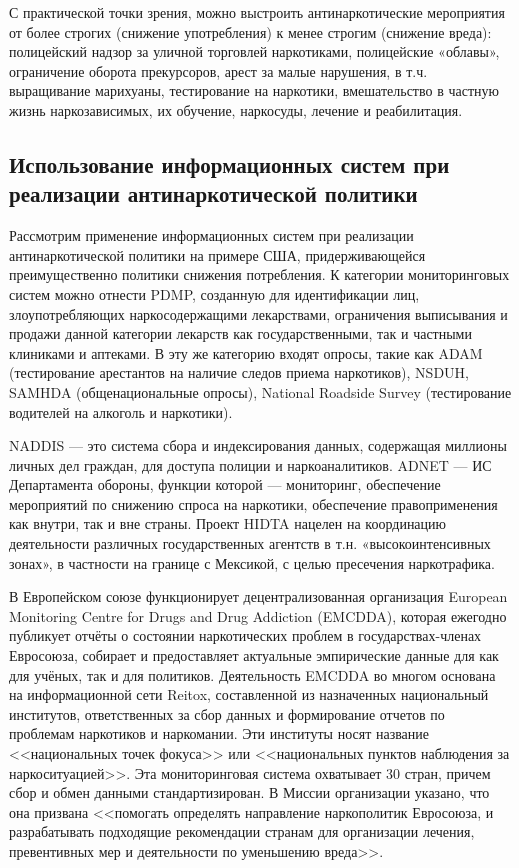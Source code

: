 \documentclass[a4paper,14pt]{article}
\begin{document}
С практической точки зрения, можно выстроить антинаркотические мероприятия от 
более строгих (снижение употребления) к менее строгим (снижение вреда): 
полицейский надзор за уличной торговлей наркотиками, полицейские «облавы», 
ограничение оборота прекурсоров, арест за малые нарушения, в т.ч. выращивание 
марихуаны, тестирование на наркотики, вмешательство в частную жизнь 
наркозависимых, их обучение, наркосуды, лечение и реабилитация.

\subsection{Использование информационных систем при реализации антинаркотической 
    политики}

Рассмотрим применение информационных систем при реализации антинаркотической 
политики на примере США, придерживающейся преимущественно политики снижения 
потребления. К категории мониторинговых систем можно отнести PDMP, созданную для 
идентификации лиц, злоупотребляющих наркосодержащими лекарствами, ограничения 
выписывания и продажи данной категории лекарств как государственными, так и 
частными клиниками и аптеками. В эту же категорию входят опросы, такие как ADAM 
(тестирование арестантов на наличие следов приема наркотиков), NSDUH, SAMHDA 
(общенациональные опросы),  National Roadside Survey (тестирование водителей на 
алкоголь и наркотики). 

NADDIS — это система сбора и индексирования данных, содержащая миллионы личных 
дел граждан, для доступа полиции и наркоаналитиков. ADNET — ИС Департамента 
обороны, функции которой — мониторинг, обеспечение мероприятий по снижению 
спроса на наркотики, обеспечение правоприменения как внутри, так и вне страны. 
Проект HIDTA нацелен на координацию деятельности различных государственных 
агентств в т.н. «высокоинтенсивных зонах», в частности на границе с Мексикой, с 
целью пресечения наркотрафика.

В Европейском союзе функционирует децентрализованная организация European 
Monitoring Centre for Drugs and Drug Addiction (EMCDDA), которая ежегодно 
публикует отчёты о состоянии наркотических проблем в государствах-членах 
Евросоюза, собирает и предоставляет актуальные эмпирические данные для как для 
учёных, так и для политиков. Деятельность EMCDDA во многом основана на 
информационной сети Reitox, составленной из назначенных национальный институтов, 
ответственных за сбор данных и формирование отчетов по проблемам наркотиков и 
наркомании.  Эти институты носят название <<национальных точек фокуса>> или 
<<национальных пунктов наблюдения за наркоситуацией>>. Эта мониторинговая 
система охватывает 30 стран, причем сбор и обмен данными стандартизирован. В 
Миссии организации указано, что она призвана <<помогать определять направление 
наркополитик Евросоюза, и разрабатывать подходящие рекомендации странам для 
организации лечения, превентивных мер и деятельности по уменьшению вреда>>.
\end{document}
